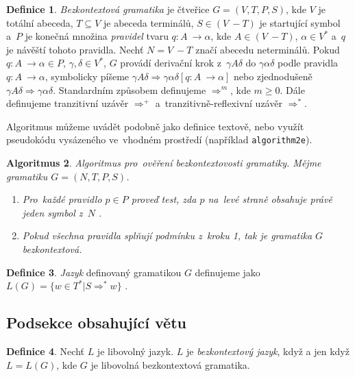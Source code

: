 \documentclass[11pt, a4paper, twocolumn]{article}
\theoremstyle{definition}
\newtheorem{definition}{Definice}[section]
\theoremstyle{plain}
\newtheorem{algorithm}[definition]{Algoritmus}
\begin{document}
\begin{definition} \label{def1.1} \emph{Bezkontextová gramatika} je čtveřice $G = (V,T,P,S)$, kde $V$ je totální a\-be\-ce\-da,
$T \subseteq V$ je abeceda terminálů, $S \in (V~- T)$ je startující symbol a~$P$ je konečná množina \emph{pravidel}
tvaru $q\colon A~\rightarrow \alpha$, kde $A \in (V~- T)$, $\alpha \in V^*$ a~$q$ je návěští tohoto pravidla. Nechť $N = V~- T$ značí abecedu neterminálů.
Pokud $q\colon  A~\rightarrow \alpha \in P$, $\gamma, \delta \in V^*$, $G$ provádí derivační krok z~$\gamma A\delta$ do $\gamma \alpha\delta$ podle pravidla $q\colon A~\rightarrow \alpha$, symbolicky píšeme 
$\gamma A\delta \Rightarrow \gamma \alpha\delta [q\colon A~\rightarrow \alpha]$ nebo zjednodušeně $\gamma A\delta \Rightarrow \gamma \alpha\delta$. Standardním způsobem definujeme $\Rightarrow^m$, kde $m \geq 0$. Dále definujeme tranzitivní uzávěr $\Rightarrow^+$ a~tranzitivně-reflexivní uzávěr $\Rightarrow^*$.\end{definition}



Algoritmus můžeme uvádět podobně jako definice textově, nebo využít pseudokódu vysázeného ve~vhodném prostředí (například \texttt{algorithm2e}).

\begin{algorithm}
Algoritmus pro~ověření bezkontextovosti gramatiky. Mějme gramatiku $G = (N, T, P, S)$.
\begin{enumerate}
 \item{Pro~každé pravidlo $p \in P$ proveď test, zda $p$ na~levé straně obsahuje právě jeden symbol z~$N$ .}
\item{Pokud všechna pravidla splňují podmínku z~kroku 1, tak je gramatika $G$ bezkontextová.}
\end{enumerate}
\end{algorithm}

\begin{definition}\emph{Jazyk} definovaný gramatikou $G$ definujeme jako $L(G)=\{w\in T^*|S\Rightarrow^*w\}$ .\end{definition}

\subsection{Podsekce obsahující větu}
\begin{definition} Nechť $L$ je libovolný jazyk. $L$ je \emph{bezkontextový jazyk}, když a jen když $L=L(G)$, kde $G$ je libovolná bezkontextová gramatika.
\end{definition}
\end{document}
